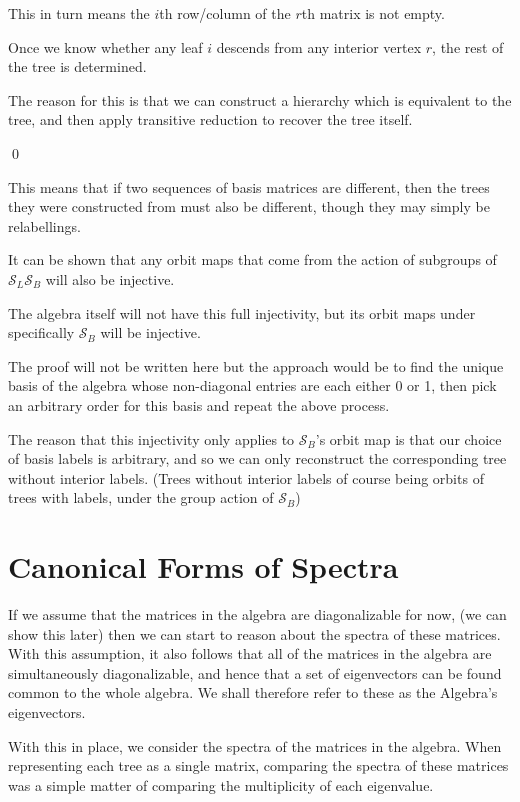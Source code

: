 \documentclass[10pt,a4paper]{report}
\newcommand{\Sym}{\mathcal{S}}
\begin{document}
This in turn means the $i$th row/column of the $r$th matrix is not empty.

Once we know whether any leaf $i$ descends from any interior vertex $r$, the rest of the tree is determined.

The reason for this is that we can construct a hierarchy which is equivalent to the tree, and then apply transitive reduction to recover the tree itself.

\qed

This means that if two sequences of basis matrices are different, then the trees they were constructed from must also be different, though they may simply be relabellings.

It can be shown that any orbit maps that come from the action of subgroups of $\Sym_L\Sym_B$ will also be injective.

The algebra itself will not have this full injectivity, but its orbit maps under specifically $\Sym_B$ will be injective.

The proof will not be written here but the approach would be to find the unique basis of the algebra whose non-diagonal entries are each either 0 or 1, then pick an arbitrary order for this basis and repeat the above process.

The reason that this injectivity only applies to $\Sym_B$'s orbit map is that our choice of basis labels is arbitrary, and so we can only reconstruct the corresponding tree without interior labels. (Trees without interior labels of course being orbits of trees with labels, under the group action of $\Sym_B$)

\section{Canonical Forms of Spectra}

If we assume that the matrices in the algebra are diagonalizable for now, (we
can show this later) then we can start to reason about the spectra of these
matrices.
With this assumption, it also follows that all of the matrices in the
algebra are simultaneously diagonalizable, and hence that a set of eigenvectors
can be found common to the whole algebra.
We shall therefore refer to these as the Algebra's eigenvectors.

With this in place, we consider the spectra of the matrices in the algebra.
When representing each tree as a single matrix, comparing the spectra of these
matrices was a simple matter of comparing the multiplicity of each eigenvalue.
\end{document}
